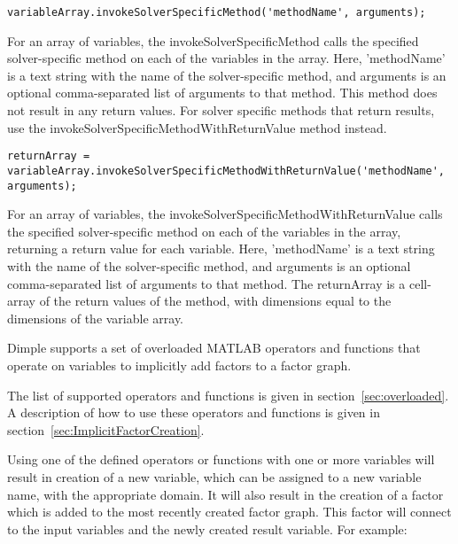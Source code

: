 \begin{lstlisting}
variableArray.invokeSolverSpecificMethod('methodName', arguments);
\end{lstlisting}

For an array of variables, the invokeSolverSpecificMethod calls the specified solver-specific method on each of the variables in the array.  Here, 'methodName' is a text string with the name of the solver-specific method, and arguments is an optional comma-separated list of arguments to that method.  This method does not result in any return values.  For solver specific methods that return results, use the invokeSolverSpecificMethodWithReturnValue method instead.

\fi

\ifmatlab
{}

\begin{lstlisting}
returnArray = variableArray.invokeSolverSpecificMethodWithReturnValue('methodName', arguments);
\end{lstlisting}

For an array of variables, the invokeSolverSpecificMethodWithReturnValue calls the specified solver-specific method on each of the variables in the array, returning a return value for each variable.  Here, 'methodName' is a text string with the name of the solver-specific method, and arguments is an optional comma-separated list of arguments to that method.  The returnArray is a cell-array of the return values of the method, with dimensions equal to the dimensions of the variable array.

\fi

\ifmatlab
{}


Dimple supports a set of overloaded MATLAB operators and functions that operate on variables to implicitly add factors to a factor graph.

The list of supported operators and functions is given in section~\ref{sec:overloaded}.  A description of how to use these operators and functions is given in section~\ref{sec:ImplicitFactorCreation}.

Using one of the defined operators or functions with one or more variables will result in creation of a new variable, which can be assigned to a new variable name, with the appropriate domain.  It will also result in the creation of a factor which is added to the most recently created factor graph.  This factor will connect to the input variables and the newly created result variable.  For example:

